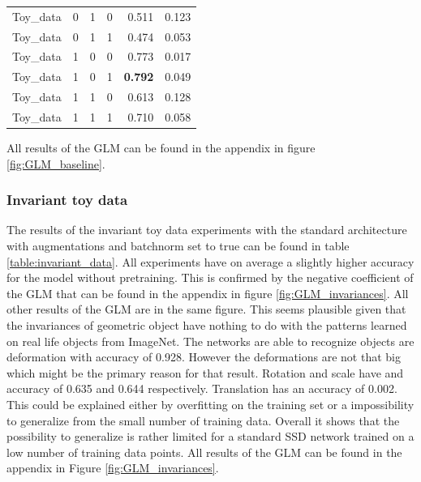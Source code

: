\begin{table}[!htb]
\begin{tabular}{lrrrrr}
		Toy\_data &              0 &          1 &           0 &  0.511 &    0.123 \\
		Toy\_data &              0 &          1 &           1 &  0.474 &    0.053 \\
		Toy\_data &              1 &          0 &           0 &  0.773 &    0.017 \\
		Toy\_data &              1 &          0 &           1 &  \textbf{0.792} &    0.049 \\
		Toy\_data &              1 &          1 &           0 &  0.613 &    0.128 \\
		Toy\_data &              1 &          1 &           1 &  0.710 &    0.058 \\
		\bottomrule
	\end{tabular}
	\label{table:baseline}
\end{table}

All results of the GLM can be found in the appendix in figure \ref{fig:GLM_baseline}. 


\subsubsection{Invariant toy data}

The results of the invariant toy data experiments with the standard architecture with augmentations and batchnorm set to true can be found in table \ref{table:invariant_data}. All experiments have on average a slightly higher accuracy for the model without pretraining. This is confirmed by the negative coefficient of the GLM that can be found in the appendix in figure \ref{fig:GLM_invariances}. All other results of the GLM are in the same figure.  This seems plausible given that the invariances of geometric object have nothing to do with the patterns learned on real life objects from ImageNet. The networks are able to recognize objects are deformation with accuracy of 0.928. However the deformations are not that big which might be the primary reason for that result. Rotation and scale have and accuracy of 0.635 and 0.644 respectively. Translation has an accuracy of 0.002. This could be explained either by overfitting on the training set or a impossibility to generalize from the small number of training data. Overall it shows that the possibility to generalize is rather limited for a standard SSD network trained on a low number of training data points. All results of the GLM can be found in the appendix in Figure \ref{fig:GLM_invariances}. 

